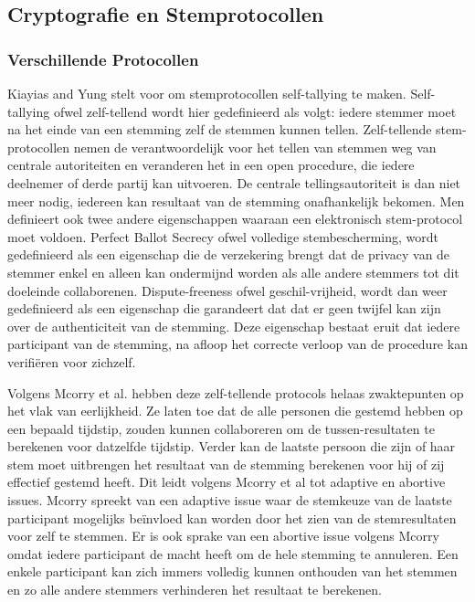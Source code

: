 	\subsection{Cryptografie en Stemprotocollen}
		\subsubsection{Verschillende Protocollen}
		Kiayias and Yung stelt voor om stemprotocollen self-tallying te maken. Self-tallying ofwel zelf-tellend wordt hier gedefinieerd als volgt: iedere stemmer moet na het einde van een stemming zelf de stemmen kunnen tellen. Zelf-tellende stem-protocollen nemen de verantwoordelijk voor het tellen van stemmen weg van centrale autoriteiten en veranderen het in een open procedure, die iedere deelnemer of derde partij kan uitvoeren. De centrale tellingsautoriteit is dan niet meer nodig, iedereen kan resultaat van de stemming onafhankelijk bekomen. Men definieert ook twee andere eigenschappen waaraan een elektronisch stem-protocol moet voldoen.  Perfect Ballot Secrecy ofwel volledige stembescherming, wordt gedefinieerd als een eigenschap die de verzekering brengt dat de privacy van de stemmer enkel en alleen kan ondermijnd worden als alle andere stemmers tot dit doeleinde collaborenen. Dispute-freeness ofwel geschil-vrijheid, wordt dan weer gedefinieerd als een eigenschap die garandeert dat dat er geen twijfel kan zijn over de authenticiteit van de stemming. Deze eigenschap bestaat eruit dat iedere participant van de stemming, na afloop het correcte verloop van de procedure kan verifiëren voor zichzelf.
			
		Volgens Mcorry et al.  hebben deze zelf-tellende protocols helaas zwaktepunten op het vlak van eerlijkheid. Ze laten toe dat de alle personen die gestemd hebben op een bepaald tijdstip, zouden kunnen collaboreren om de tussen-resultaten te berekenen voor datzelfde tijdstip. Verder kan de laatste persoon die zijn of haar stem moet uitbrengen het resultaat van de stemming berekenen voor hij of zij effectief gestemd heeft. Dit leidt volgens Mcorry et al tot adaptive en abortive issues.  Mcorry spreekt van een adaptive issue waar de stemkeuze van de laatste participant mogelijks beïnvloed kan worden door het zien van de stemresultaten voor zelf te stemmen. Er is ook sprake van een abortive issue volgens Mcorry omdat iedere participant de macht heeft om de hele stemming te annuleren. Een enkele participant kan zich immers volledig kunnen onthouden van het stemmen en zo alle andere stemmers verhinderen het resultaat te berekenen. 
			
